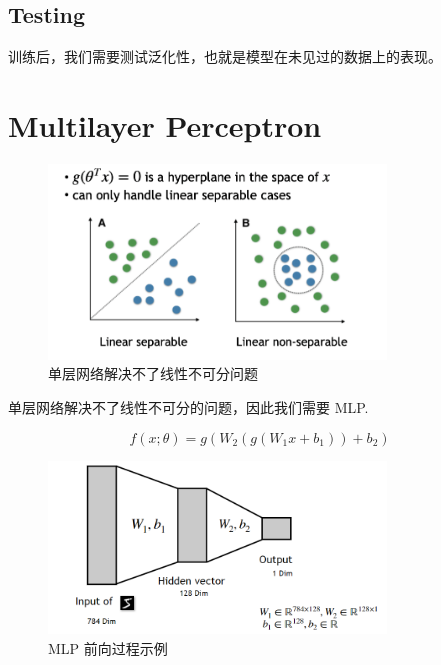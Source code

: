 \subsection{Testing}
训练后，我们需要测试泛化性，也就是模型在未见过的数据上的表现。

\section{Multilayer Perceptron}

\begin{figure}[htbp]
    \centering
    \includegraphics[width=0.8\textwidth]{figures/single_layer_issue.png}
    \caption{单层网络解决不了线性不可分问题}
    \label{fig:single-layer-issue}
\end{figure}



\begin{note}
    单层网络解决不了线性不可分的问题，因此我们需要 MLP. 
\end{note}


$$ f(x; \theta) = g(W_2(g(W_1 x + b_1)) + b_2) $$


\begin{figure}[htbp]
    \centering
    \includegraphics[width=0.8\textwidth]{figures/mlp.png}
    \caption{MLP 前向过程示例}
    \label{fig:mlp}
\end{figure}



